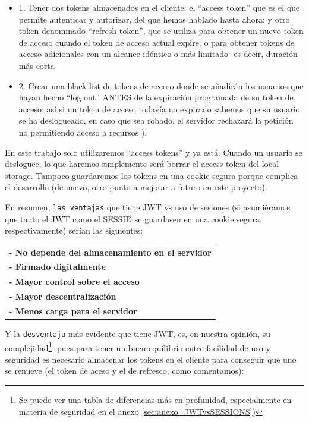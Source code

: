 \documentclass[a4paper,12pt]{report}
\begin{document}
				\begin{itemize}
					\setlength{\itemsep}{.0em}
				
					\item 1. Tener dos tokens almacenados en el cliente: el ``access token'' que es el que permite autenticar y autorizar, del que hemos hablado hasta ahora; y otro token denominado ``refresh token'', que se utiliza
					para obtener un nuevo token de acceso cuando el token de acceso actual expire, o para obtener tokens de acceso adicionales con un alcance idéntico o más limitado -es decir, duración más corta- \cite{stackoverflow_refreshTokenAvantatjaSeguretat}
					
					\item 2. Crear una black-list de tokens de acceso donde se añadirán los usuarios que hayan hecho ``log out'' ANTES de la expiración programada de su token de acceso: así si un token de acceso todavía no expirado sabemos que su usuario se ha deslogueado, en caso que sea robado, el servidor rechazará la petición no permitiendo acceso a recursos \cite{stackOverflow_blackList}).
 
					
				\end{itemize}

				
				
				En este trabajo solo utilizaremos ``access tokens'' y ya está. Cuando un usuario se desloguee, lo que haremos simplemente será borrar el access token del local storage. Tampoco guardaremos los tokens en una cookie segura porque complica el desarrollo (de nuevo, otro punto a mejorar a futuro en este proyecto).
			
				 
				 \noindent En resumen, \texttt{las ventajas} que tiene JWT vs uso de sesiones (si asumiéramos que tanto el JWT como el SESSID se guardasen en una cookie segura, respectivamente) serían las siguientes:
				 
					\begin{tabular}{l}
						\textbf{- No depende del almacenamiento en el servidor} \\
						\textbf{- Firmado digitalmente} \\
						\textbf{- Mayor control sobre el acceso} \\
						\textbf{- Mayor descentralización} \\
						\textbf{- Menos carga para el servidor}
					\end{tabular}
									 
				   \noindent Y la \texttt{desventaja} más evidente que tiene JWT, es, en nuestra opinión, su complejidad\footnote{Se puede ver una tabla de diferencias más en profunidad, especialmente en materia de seguridad en el anexo \ref{sec:anexo_JWTvsSESSIONS})}, pues para tener un buen equilibrio entre facilidad de uso y seguridad es necesario almacenar los tokens en el cliente para conseguir que uno se renueve (el token de aceso y el de refresco, como comentamos):
				  
\end{document}
